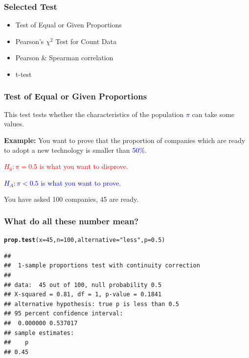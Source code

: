 \documentclass[12pt]{beamer}\usepackage[]{graphicx}\usepackage[]{color}
\makeatletter
\newcommand{\hlnum}[1]{\textcolor[rgb]{0.686,0.059,0.569}{#1}}%
\newcommand{\hlstr}[1]{\textcolor[rgb]{0.192,0.494,0.8}{#1}}%
\newcommand{\hlstd}[1]{\textcolor[rgb]{0.345,0.345,0.345}{#1}}%
\newcommand{\hlkwc}[1]{\textcolor[rgb]{0.333,0.667,0.333}{#1}}%
\newcommand{\hlkwd}[1]{\textcolor[rgb]{0.737,0.353,0.396}{\textbf{#1}}}%
\newenvironment{kframe}{%
 \def\at@end@of@kframe{}%
 \ifinner\ifhmode%
  \def\at@end@of@kframe{\end{minipage}}%
  \begin{minipage}{\columnwidth}%
 \fi\fi%
 \def\FrameCommand##1{\hskip\@totalleftmargin \hskip-\fboxsep
 \colorbox{shadecolor}{##1}\hskip-\fboxsep
     \hskip-\linewidth \hskip-\@totalleftmargin \hskip\columnwidth}%
 \MakeFramed {\advance\hsize-\width
   \@totalleftmargin\z@ \linewidth\hsize
   \@setminipage}}%
 {\par\unskip\endMakeFramed%
 \at@end@of@kframe}
\newenvironment{knitrout}{}{} %
\makeatother
\begin{document}

\begin{frame}\large
\frametitle{Selected Test}

\begin{itemize}
 \item Test of Equal or Given Proportions
 \item Pearson's $\chi^2$ Test for Count Data
 \item Pearson \& Spearman correlation
 \item t-test
\end{itemize}

\end{frame}


\begin{frame}\large
\frametitle{Test of Equal or Given Proportions}

This test tests whether the characteristics of the population \textcolor{blue}{$\pi$} can take some values.\bigskip

\textbf{Example:} You want to prove that the proportion of companies which are ready to adopt a new technology is smaller than \textcolor{blue}{50\%}. \smallskip{}


\textcolor{red}{$H_0: \pi=0.5$ is what you want to disprove.} \smallskip

\textcolor{blue}{$H_A: \pi< 0.5$ is what you want to prove.}\bigskip{}

You have asked 100 companies, 45 are ready.

\end{frame}


\begin{frame}[fragile]

\frametitle{What do all these number mean?}

\begin{knitrout}\small
{}\color{fgcolor}\begin{kframe}
\begin{alltt}
\hlkwd{prop.test}\hlstd{(}\hlkwc{x}\hlstd{=}\hlnum{45}\hlstd{,} \hlkwc{n}\hlstd{=}\hlnum{100}\hlstd{,} \hlkwc{alternative}\hlstd{=}\hlstr{"less"}\hlstd{,} \hlkwc{p}\hlstd{=}\hlnum{0.5}\hlstd{)}
\end{alltt}
\begin{verbatim}
## 
## 	1-sample proportions test with continuity correction
## 
## data:  45 out of 100, null probability 0.5
## X-squared = 0.81, df = 1, p-value = 0.1841
## alternative hypothesis: true p is less than 0.5
## 95 percent confidence interval:
##  0.000000 0.537017
## sample estimates:
##    p 
## 0.45
\end{verbatim}
\end{kframe}
\end{knitrout}

\end{frame}
\end{document}
